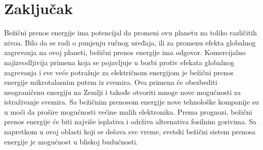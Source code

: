 \documentclass[a4paper]{article}
\begin{document}
\section{Zaključak}

Bežični prenos energije ima potencijal da promeni ovu planetu na toliko različitih nivoa. Bilo da se radi o punjenju ručnog uređaja, ili za promenu efekta globalnog zagrevanja na ovoj planeti, bežični prenos energije ima odgovor. Komercijalno najizvodljivija primena koja se pojavljuje u borbi protiv efekata globalnog zagrevanja i sve veće potražnje za električnom energijom je bežični prenos energije mikrotalasnim putem iz svemira. Ova primena će obezbediti neograničenu energiju na Zemlji i takođe otvoriti mnoge nove mogućnosti za istraživanje svemira. Sa bežičnim prenosom energije nove tehnološke kompanije su u moći da prošire mogućnosti većine malih elektronika. Prema prognozi, bežični prenos energije će biti najviše isplativa i održiva alternativa fosilnim gorivima. Sa napretkom u ovoj oblasti koji se dešava sve vreme, svetski bežični sistem prenosa energije je mogućnost u bliskoj budućnosti.




\end{document}

